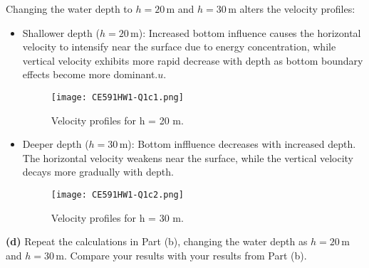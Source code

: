 \documentclass[a4paper]{article}
\begin{document}
Changing the water depth to \( h = 20 \, \text{m} \) and \( h = 30 \, \text{m} \) alters the velocity profiles:  

\begin{itemize}  
    \item {Shallower depth (\( h = 20 \, \text{m} \))}: Increased bottom influence causes the horizontal velocity to intensify near the surface due to energy concentration, while vertical velocity exhibits more rapid decrease with depth as bottom boundary effects become more dominant.\( u \). 
    \begin{figure}[H]
        \centering
        \texttt{[image: CE591HW1-Q1c1.png]}
        \caption{\small Velocity profiles for h = 20 m.}
        \label{fig:plot2c_1}
    \end{figure} 
    \item {Deeper depth (\( h = 30 \, \text{m} \))}: Bottom inffluence decreases with increased depth. The horizontal velocity weakens near the surface, while the vertical velocity decays more gradually with depth. 
    \begin{figure}[H]
        \centering
        \texttt{[image: CE591HW1-Q1c2.png]}
        \caption{\small Velocity profiles for h = 30 m.}
        \label{fig:plot2c_2}
    \end{figure} 
\end{itemize}  

\textbf{(d)} Repeat the calculations in Part (b), changing the water depth as \( h = 20 \, \text{m} \) and \( h = 30 \, \text{m} \). Compare your results with your results from Part (b).
\vspace{0.3cm}
\end{document}

